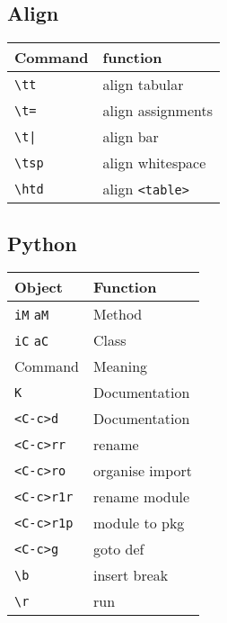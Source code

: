 \documentclass[a4paper]{article}
\newcommand{\rcmd}[1]{\texttt{\textbackslash #1}}
\newcommand{\kc}[1]{\texttt{\textless #1\textgreater}}
\begin{document}
%
\begin{minipage}[t]{0.33\textwidth}
  \subsection*{Align}
  \begin{tabular}{l l}
    \toprule
    Command     & function               \\
    \midrule
    \rcmd{tt}   & align tabular          \\
    \rcmd{t=}   & align assignments      \\
    \rcmd{t|}   & align bar              \\
    \rcmd{tsp}  & align whitespace       \\
    \rcmd{htd}  & align \texttt{<table>} \\
    \bottomrule
  \end{tabular}
  \subsection*{Python}
  \begin{tabular}{l l}
    \toprule
    Object                  & Function        \\
    \midrule
    \texttt{iM} \texttt{aM} & Method          \\
    \texttt{iC} \texttt{aC} & Class           \\
    \midrule
    \midrule
    Command                 & Meaning         \\
    \midrule
    \texttt{K}              & Documentation   \\
    \kc{C-c}\texttt{d}      & Documentation   \\
    \kc{C-c}\texttt{rr}     & rename          \\
    \kc{C-c}\texttt{ro}     & organise import \\
    \kc{C-c}\texttt{r1r}    & rename module   \\
    \kc{C-c}\texttt{r1p}    & module to pkg   \\
    \kc{C-c}\texttt{g}      & goto def        \\
    \rcmd{b}                & insert break    \\
    \rcmd{r}                & run             \\
    \bottomrule
  \end{tabular}

\end{minipage}
\end{document}
